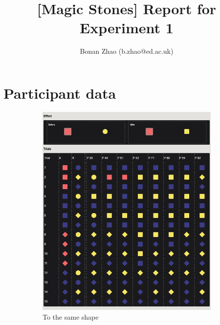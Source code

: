 \documentclass{article}
\title{[Magic Stones] Report for Experiment 1}
\author{Bonan Zhao (b.zhao@ed.ac.uk)}
\begin{document}
\maketitle

\section{Participant data}

\begin{figure}[h!]
	\centering
  \begin{subfigure}[t]{0.32\textwidth}
  	\centering
  	\includegraphics[width=\linewidth]{learn01} 
  	\caption{To the same shape} \label{fig:learn01}
  \end{subfigure}
  \hfill
  \begin{subfigure}[t]{0.32\textwidth}
  	\centering

\end{subfigure}
\end{figure}
\end{document}
